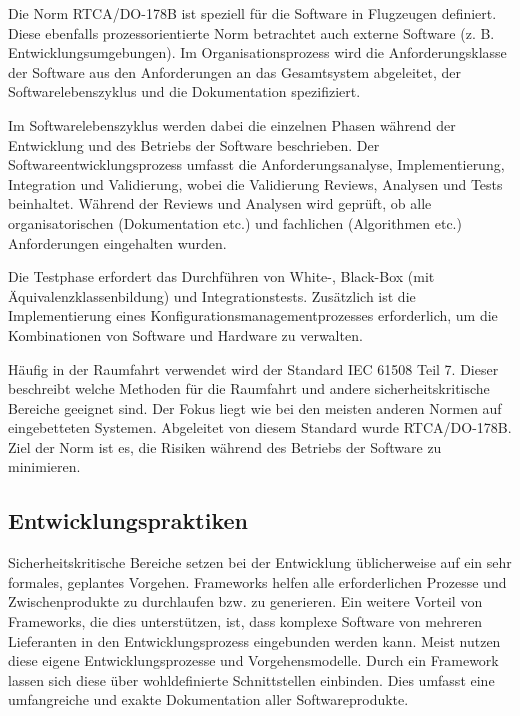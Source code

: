Die Norm RTCA/DO-178B ist speziell für die Software in Flugzeugen definiert.
Diese ebenfalls prozessorientierte Norm betrachtet auch externe Software (z. B. Entwicklungsumgebungen).
Im Organisationsprozess wird die Anforderungsklasse der Software aus den Anforderungen an das Gesamtsystem abgeleitet, der Softwarelebenszyklus und die Dokumentation spezifiziert.
\parencite[Vgl.][S. 71]{Hohler:1998aa}

Im Softwarelebenszyklus werden dabei die einzelnen Phasen während der Entwicklung und des Betriebs der Software beschrieben.
Der Softwareentwicklungsprozess umfasst die Anforderungsanalyse, Implementierung, Integration und Validierung, wobei die Validierung Reviews, Analysen und Tests beinhaltet.
Während der Reviews und Analysen wird geprüft, ob alle organisatorischen (Dokumentation etc.) und fachlichen (Algorithmen etc.) Anforderungen eingehalten wurden.
\parencite[Vgl.][S. 71]{Hohler:1998aa}

Die Testphase erfordert das Durchführen von White-, Black-Box (mit Äquivalenzklassenbildung) und Integrationstests.
Zusätzlich ist die Implementierung eines Konfigurationsmanagementprozesses erforderlich, um die Kombinationen von Software und Hardware zu verwalten.
\parencite[Vgl.][S. 71]{Hohler:1998aa}

Häufig in der Raumfahrt verwendet wird der Standard IEC 61508 Teil 7.
Dieser beschreibt welche Methoden für die Raumfahrt und andere sicherheitskritische Bereiche geeignet sind.
Der Fokus liegt wie bei den meisten anderen Normen auf eingebetteten Systemen.
Abgeleitet von diesem Standard wurde RTCA/DO-178B.
Ziel der Norm ist es, die Risiken während des Betriebs der Software zu minimieren.
\parencite[Vgl.][S. 40]{Carpenter:2014aa}

\subsection{Entwicklungspraktiken} %

Sicherheitskritische Bereiche setzen bei der Entwicklung üblicherweise auf ein sehr formales, geplantes Vorgehen.
Frameworks helfen alle erforderlichen Prozesse und Zwischenprodukte zu durchlaufen bzw. zu generieren.
Ein weitere Vorteil von Frameworks, die dies unterstützen, ist, dass komplexe Software von mehreren Lieferanten in den Entwicklungsprozess eingebunden werden kann.
Meist nutzen diese eigene Entwicklungsprozesse und Vorgehensmodelle.
Durch ein Framework lassen sich diese über wohldefinierte Schnittstellen einbinden.
Dies umfasst eine umfangreiche und exakte Dokumentation aller Softwareprodukte.
\parencite[Vgl.][S. 39]{Carpenter:2014aa}

